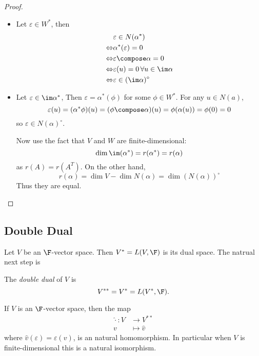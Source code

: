 \documentclass[a4paper]{article}
\newcommand*{\ann}{\circ}
\theoremstyle{definition}
\begin{document}
\begin{proof}\leavevmode
  \begin{itemize}
  \item Let \(\varepsilon \in W^*\), then
  \begin{align*}
    & \varepsilon \in N(\alpha^*) \\
    \Leftrightarrow & \alpha^* (\varepsilon) = 0 \\
    \Leftrightarrow & \varepsilon \compose \alpha = 0 \\
    \Leftrightarrow & \varepsilon(u) = 0 \, \forall u \in \im \alpha \\
    \Leftrightarrow & \varepsilon \in (\im \alpha)^\ann
  \end{align*}

\item Let \(\varepsilon \in \im \alpha^*\), Then \(\varepsilon = \alpha^* (\phi)\) for some \(\phi \in W^*\). For any \(u \in N(a)\),
  \[
    \varepsilon(u) = (\alpha^* \phi)(u) = (\phi\compose \alpha)(u) = \phi(\alpha(u)) = \phi(0) = 0
  \]
  so \(\varepsilon \in N(\alpha)^\ann\).

  Now use the fact that \(V\) and \(W\) are finite-dimensional:
  \[
    \dim \im(\alpha^*) = r(\alpha^*) = r(\alpha)
  \]
  as \(r(A) = r(A^T)\). On the other hand,
  \[
    r(\alpha) = \dim V - \dim N(\alpha) = \dim (N(\alpha))^\ann
  \]
  Thus they are equal.
\end{itemize}
\end{proof}

\subsection{Double Dual}

Let \(V\) be an \(\F\)-vector space. Then \(V^* = L(V,\F)\) is its dual space. The natrual next step is

\begin{definition}
  The \emph{double dual} of \(V\) is
  \[
    V^{**} = V^* = L(V^*, \F).
  \]
\end{definition}

\begin{theorem}
  If \(V\) is an \(\F\)-vector space, then the map
  \begin{align*}
    \hat \cdot: V &\to V^{**} \\
    v &\mapsto \hat v
  \end{align*}
  where \(\hat v(\varepsilon) = \varepsilon(v)\), is an natural homomorphism. In particular when \(V\) is finite-dimensional this is a natural isomorphism.
\end{theorem}
\end{document}
